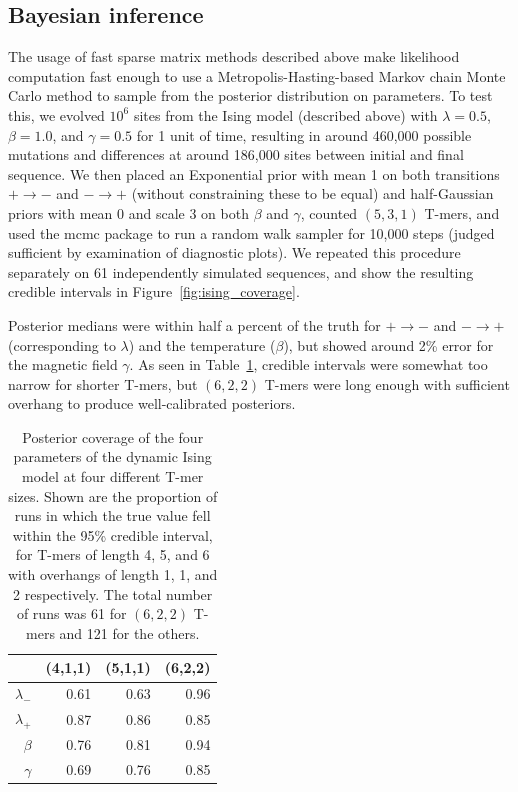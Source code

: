 \documentclass{article}
\theoremstyle{plain}
\theoremstyle{definition}
\begin{document}
\subsection{Bayesian inference}

The usage of fast sparse matrix methods described above make likelihood computation fast enough
to use a Metropolis-Hasting-based Markov chain Monte Carlo method
to sample from the posterior distribution on parameters.
To test this,
we evolved $10^6$ sites from the Ising model (described above) with $\lambda=0.5$, $\beta=1.0$, and $\gamma=0.5$
for 1 unit of time,
resulting in around 460,000 possible mutations
and differences at around 186,000 sites between initial and final sequence.
We then placed an Exponential prior with mean 1 on both transitions $+ \to -$ and $- \to +$
(without constraining these to be equal)
and half-Gaussian priors with mean 0 and scale 3 on both $\beta$ and $\gamma$,
counted $(5,3,1)$ T-mers,
and used the mcmc package \citep{geyer2017mcmc} to run a random walk sampler for 10,000 steps
(judged sufficient by examination of diagnostic plots).
We repeated this procedure separately on 61 independently simulated sequences,
and show the resulting credible intervals in Figure~\ref{fig:ising_coverage}.

Posterior medians were within half a percent of the truth for $+ \to -$ and $- \to +$ (corresponding to $\lambda$)
and the temperature ($\beta$), but showed around 2\% error for the magnetic field $\gamma$.
As seen in Table~\ref{tab:ising_coverage},
credible intervals were somewhat too narrow for shorter T-mers,
but $(6,2,2)$ T-mers were long enough with sufficient overhang to produce well-calibrated posteriors.

\begin{table}[ht]
\centering
\begin{tabular}{rrrr}
  \hline
    & (4,1,1) & (5,1,1) & (6,2,2) \\
  \hline
  $\lambda_-$ & 0.61 & 0.63 & 0.96 \\
  $\lambda_+$ & 0.87 & 0.86 & 0.85 \\
  $\beta$     & 0.76 & 0.81 & 0.94 \\
  $\gamma$    & 0.69 & 0.76 & 0.85 \\
   \hline
\end{tabular}
    \caption{
        Posterior coverage of the four parameters of the dynamic Ising model at four different T-mer sizes.
        Shown are the proportion of runs in which the true value fell within the 95\% credible interval,
        for T-mers of length 4, 5, and 6 with overhangs of length 1, 1, and 2 respectively.
        The total number of runs was 61 for $(6,2,2)$ T-mers and 121 for the others.
        \label{tab:ising_coverage}
    }
\end{table}
\end{document}
